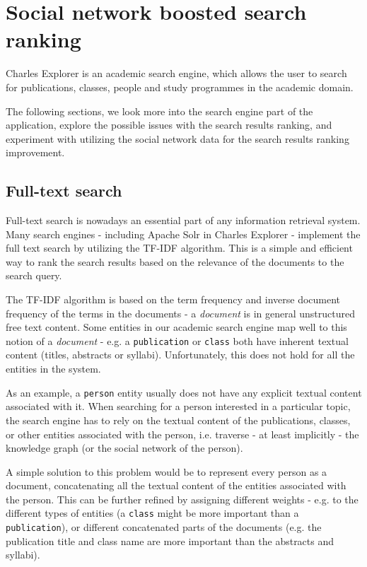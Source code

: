 \chapter{Social network boosted search ranking}

Charles Explorer is an academic search engine, which allows the user to search for publications, classes, people and study programmes in the academic domain.

The following sections, we look more into the search engine part of the application, explore the possible issues with the search results ranking, 
and experiment with utilizing the social network data for the search results ranking improvement.

\section{Full-text search}

Full-text search is nowadays an essential part of any information retrieval system. 
Many search engines - including Apache Solr in Charles Explorer - implement the full text search by utilizing the TF-IDF algorithm.
This is a simple and efficient way to rank the search results based on the relevance of the documents to the search query.

The TF-IDF algorithm is based on the term frequency and inverse document frequency of the terms in the documents - a \textit{document} is in general unstructured free text content.
Some entities in our academic search engine map well to this notion of a \textit{document} - e.g. a \texttt{publication} or \texttt{class} both have inherent textual content (titles, abstracts or syllabi).
Unfortunately, this does not hold for all the entities in the system.

As an example, a \texttt{person} entity usually does not have any explicit textual content associated with it. 
When searching for a person interested in a particular topic, the search engine has to rely on the textual content of the publications, classes, 
or other entities associated with the person, i.e. traverse - at least implicitly - the knowledge graph (or the social network of the person).

A simple solution to this problem would be to represent every person as a document, concatenating all the textual content of the entities associated with the person.
This can be further refined by assigning different weights - e.g. to the different types of entities (a \texttt{class} might be more important than a \texttt{publication}), 
or different concatenated parts of the documents (e.g. the publication title and class name are more important than the abstracts and syllabi).

